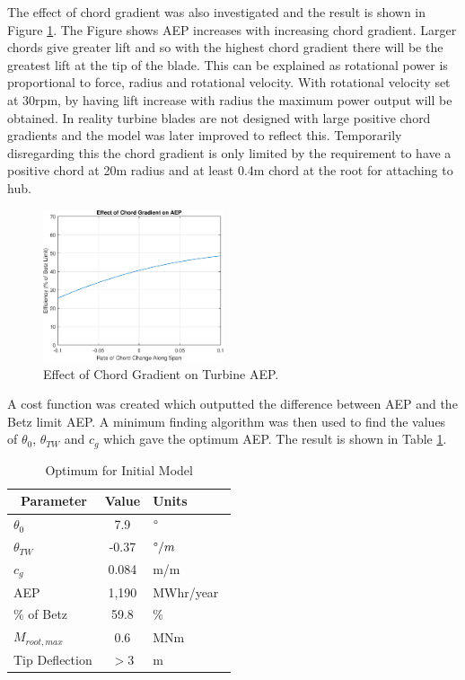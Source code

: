 \documentclass[11pt]{article}
\newcommand{\ra}[1]{\renewcommand{\arraystretch}{#1}}
\begin{document}
\FloatBarrier
The effect of chord gradient was also investigated and the result is shown in Figure \ref{fig:changegrad}. The Figure shows AEP increases with increasing chord gradient. Larger chords give greater lift and so with the highest chord gradient there will be the greatest lift at the tip of the blade. This can be explained as rotational power is proportional to force, radius and rotational velocity. With rotational velocity set at 30rpm, by having lift increase with radius the maximum power output will be obtained. In reality turbine blades are not designed with large positive chord gradients and the model was later improved to reflect this. Temporarily disregarding this the chord gradient is only limited by the requirement to have a positive chord at 20m radius and at least 0.4m chord at the root for attaching to hub.\\

\begin{figure}[h!]
\centering
	\includegraphics[width=0.475\textwidth]{ChangeGrad}
	\caption{Effect of Chord Gradient on Turbine AEP.}\label{fig:changegrad}
\end{figure}
\FloatBarrier
A cost function was created which outputted the difference between AEP and the Betz limit AEP. A minimum finding algorithm was then used to find the values of $\theta_0$, $\theta_{TW}$ and $c_g$ which gave the optimum AEP. The result is shown in Table \ref{table:simpleresult}. 


\begin{table}[!h]
\centering %
\ra{1.3}
\begin{tabular}{@{}lcl@{}}\toprule
\ \textbf{Parameter}  & \textbf{Value}  &  \textbf{Units} \\
\midrule
$\theta_0$  & 7.9 & $\degree$ \ \\
$\theta_{TW}$ & -0.37 & $\degree/m$  \\
$c_{g}$ & 0.084 & m/m \ \\
\midrule
AEP  & 1,190 & MWhr/year\ \\
\% of Betz & 59.8 & \% \ \\
\midrule
$M_{root,max}$ & 0.6 & MNm \\
Tip Deflection  & $>3$ & m \\
\bottomrule
\end{tabular}
\caption{Optimum for Initial Model}
\label{table:simpleresult}
\end{table}
\end{document}
